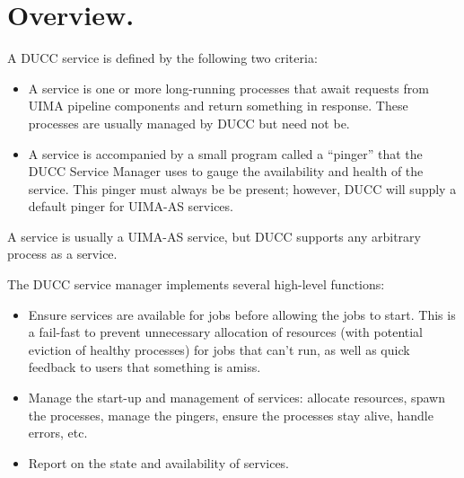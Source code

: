 % 
% 
% 
% 

      \section{Overview.} 
      A DUCC service is defined by the following two criteria:
      \begin{itemize}
          \item A service is one or more long-running processes that await requests from
            UIMA pipeline components and return something in response.  These processes
            are usually managed by DUCC but need not be.
          \item A service is accompanied by a small program called a ``pinger'' that
            the DUCC Service Manager uses to gauge the availability and health of the
            service.  This pinger must always be be present; however, DUCC will
            supply a default pinger for UIMA-AS services.
      \end{itemize}

      A service is usually a UIMA-AS service, but DUCC supports any arbitrary process
      as a service.

      The DUCC service manager implements several high-level functions:
      
      \begin{itemize}
          \item Ensure services are available for jobs before allowing the jobs to start. This is a fail-fast
            to prevent unnecessary allocation of resources (with potential eviction of healthy processes)
            for jobs that can't run, as well as quick feedback to users that something is amiss.
      
          \item Manage the start-up and management of services: allocate resources, spawn the
            processes, manage the pingers, ensure the processes stay alive, handle errors, etc.
      
          \item Report on the state and availability of services.
       \end{itemize}


